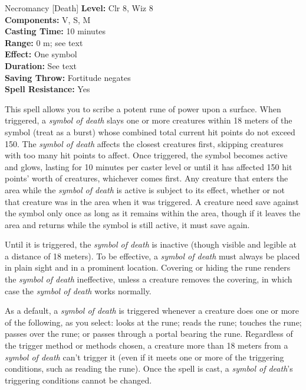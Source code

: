 {Necromancy [Death]}
{
	\textbf{Level:}
	Clr 8, Wiz 8\\
	\textbf{Components:}
	V, S, M\\
	\textbf{Casting Time:}
	10 minutes\\
	\textbf{Range:}
	0 m; see text\\
	\textbf{Effect:}
	One symbol\\
	\textbf{Duration:}
	See text\\
	\textbf{Saving Throw:}
	Fortitude negates\\
	\textbf{Spell Resistance:}
	Yes\\
}
{
	This spell allows you to scribe a potent rune of power upon a surface. When triggered, a \emph{symbol of death} slays one or more creatures within 18 meters of the symbol (treat as a burst) whose combined total current hit points do not exceed 150. The \emph{symbol of death} affects the closest creatures first, skipping creatures with too many hit points to affect. Once triggered, the symbol becomes active and glows, lasting for 10 minutes per caster level or until it has affected 150 hit points' worth of creatures, whichever comes first. Any creature that enters the area while the \emph{symbol of death} is active is subject to its effect, whether or not that creature was in the area when it was triggered. A creature need save against the symbol only once as long as it remains within the area, though if it leaves the area and returns while the symbol is still active, it must save again.

	Until it is triggered, the \emph{symbol of death} is inactive (though visible and legible at a distance of 18 meters). To be effective, a \emph{symbol of death} must always be placed in plain sight and in a prominent location. Covering or hiding the rune renders the \emph{symbol of death} ineffective, unless a creature removes the covering, in which case the \emph{symbol of death} works normally.

	As a default, a \emph{symbol of death} is triggered whenever a creature does one or more of the following, as you select: looks at the rune; reads the rune; touches the rune; passes over the rune; or passes through a portal bearing the rune. Regardless of the trigger method or methods chosen, a creature more than 18 meters from a \emph{symbol of death} can't trigger it (even if it meets one or more of the triggering conditions, such as reading the rune). Once the spell is cast, a \emph{symbol of death}'s triggering conditions cannot be changed.

}
